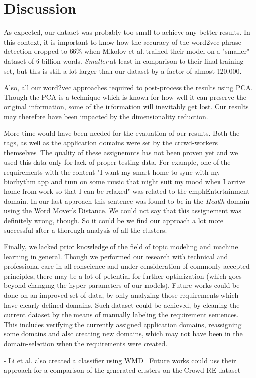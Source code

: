 \section{Discussion}
\label{sec:discussion}
As expected, our dataset was probably too small to achieve any better results. In this context, it is important to know how the accuracy of the word2vec phrase detection dropped to 66\% when Mikolov et al. trained their model on a "smaller" dataset of 6 billion words\cite[p7]{mikolov_distributed_2013}. \emph{Smaller} at least in comparison to their final training set, but this is still a lot larger than our dataset by a factor of almost 120.000.

Also, all our word2vec approaches required to post-process the results using PCA. Though the PCA is a technique which is known for how well it can preserve the original information, some of the information will inevitably get lost. Our results may therefore have been impacted by the dimensionality reduction.

More time would have been needed for the evaluation of our results. Both the tags, as well as the application domains were set by the crowd-workers themselves. The quality of these assignemnts has not been proven yet and we used this data only for lack of proper testing data. For example, one of the requirements with the content "I want my smart home to sync with my biorhythm app and turn on some music that might suit my mood when I arrive home from work so that I can be relaxed" was related to the emph{Entertainment} domain. In our last approach this sentence was found to be in the \emph{Health} domain using the Word Mover's Distance. We could not say that this assignement was definitely wrong, though. So it could be we find our approach a lot more successful after a thorough analysis of all the clusters.

Finally, we lacked prior knowledge of the field of topic modeling and machine learning in general. Though we performed our research with technical and professional care in all conscience and under consideration of commonly accepted principles, there may be a lot of potential for further optimization (which goes beyond changing the hyper-parameters of our models). Future works could be done on an improved set of data, by only analyzing those requirements which have clearly defined domains. Such dataset could be achieved, by cleaning the current \crowdre{} dataset by the means of manually labeling the requirement sentences. This includes verifying the currently assigned application domains, reassigning some domains and also creating new domains, which may not have been in the domain-selection when the requirements were created.

- Li et al. also created a classifier using WMD \cite{li_classifying_2019}. Future works could use their approach for a comparison of the generated clusters on the Crowd RE dataset
\\[2cm]